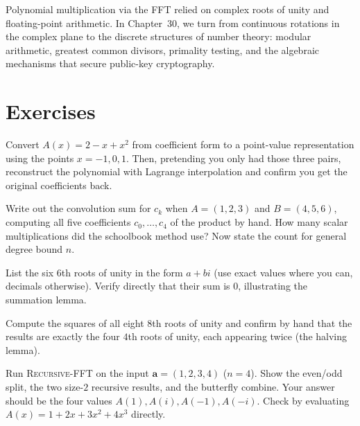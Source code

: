 Polynomial multiplication via the FFT relied on complex roots of unity and floating-point arithmetic. In Chapter~30, we turn from continuous rotations in the complex plane to the discrete structures of number theory: modular arithmetic, greatest common divisors, primality testing, and the algebraic mechanisms that secure public-key cryptography.

\section{Exercises}

\begin{exercise}\label{ch29:ex-pv}
Convert $A(x) = 2 - x + x^2$ from coefficient form to a point-value representation
using the points $x=-1,0,1$. Then, pretending you only had those three pairs,
reconstruct the polynomial with Lagrange interpolation and confirm you get the
original coefficients back.
\end{exercise}

\begin{exercise}\label{ch29:ex-conv}
Write out the convolution sum for $c_k$ when $A=(1,2,3)$ and $B=(4,5,6)$, computing
all five coefficients $c_0,\dots,c_4$ of the product by hand. How many scalar
multiplications did the schoolbook method use? Now state the count for general degree
bound $n$.
\end{exercise}

\begin{exercise}\label{ch29:ex-roots}
List the six $6$th roots of unity in the form $a+bi$ (use exact values where you can,
decimals otherwise). Verify directly that their sum is $0$, illustrating the
summation lemma.
\end{exercise}

\begin{exercise}\label{ch29:ex-halving}
Compute the squares of all eight $8$th roots of unity and confirm by hand that the
results are exactly the four $4$th roots of unity, each appearing twice (the halving
lemma).
\end{exercise}

\begin{exercise}\label{ch29:ex-trace}
Run \textsc{Recursive-FFT} on the input $\mathbf{a} = (1,2,3,4)$ ($n=4$). Show the
even/odd split, the two size-$2$ recursive results, and the butterfly combine. Your
answer should be the four values $A(1),A(i),A(-1),A(-i)$. Check by evaluating
$A(x)=1+2x+3x^2+4x^3$ directly.
\end{exercise}

